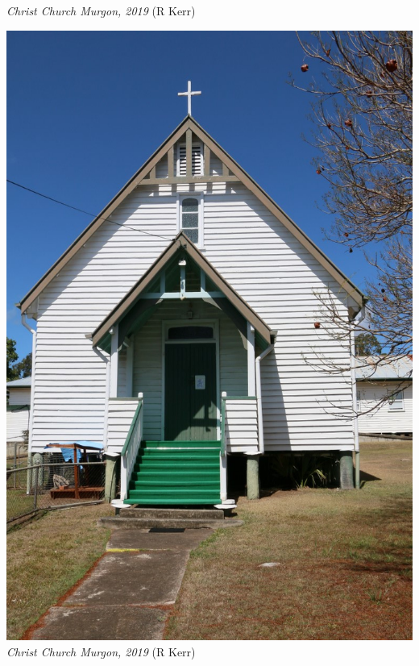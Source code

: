\documentclass[a4paper,11pt,parskip=never,DIV=8,chapterprefix=true,titlepage=true,twoside,twocolumn,open=any]{scrbook}
\begin{document}
\begin{titlepage}
\begin{minipage}[b]{\textwidth}
\begin{center}
{\small {\itshape Christ Church Murgon, 2019} (R Kerr)}
\end{center}
\end{minipage}
\newpage
\thispagestyle{empty}
\par\vspace*{.1\textheight}
\noindent\begin{minipage}[t]{\textwidth}
\begin{center}
\includegraphics[width=.8\linewidth,center]{../images/christChurchMurgon_front_2019_11_29.jpg}
{\small {\itshape Christ Church Murgon, 2019} (R Kerr)}
\end{center}
\end{minipage}\par

\end{titlepage}
\onecolumn
\frontmatter
\end{document}
